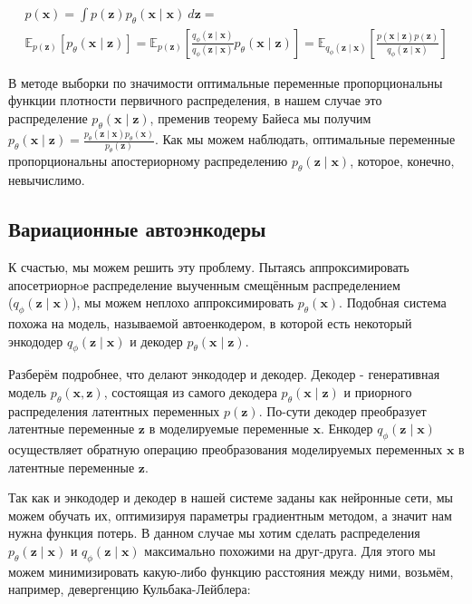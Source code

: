 \documentclass{article}
\begin{document}
\begin{gather*}
    p(\mathbf{x}) = \int p(\mathbf{z})p_\theta(\mathbf{x} \mid \mathbf{x})~d\mathbf{z} =\\
        \mathbb{E}_{p(\mathbf{z})} \left[p_{\theta}(\mathbf{x} \mid \mathbf{z})\right] = 
        \mathbb{E}_{p(\mathbf{z})} \left[\frac{q_\phi(\mathbf{z} \mid \mathbf{x})}{q_\phi(\mathbf{z} \mid \mathbf{x})}p_{\theta}(\mathbf{x} \mid \mathbf{z})\right] =
        \mathbb{E}_{q_\phi(\mathbf{z} \mid \mathbf{x})} \left[\frac{p(\mathbf{x} \mid \mathbf{z})p(\mathbf{z})}{q_\phi(\mathbf{z} \mid \mathbf{x})}\right]
    \tag{3}
\end{gather*}

В методе выборки по значимости оптимальные переменные пропорциональны функции плотности первичного распределения, в нашем случае это распределение
$p_\theta(\mathbf{x} \mid \mathbf{z})$, пременив теорему Байеса мы получим $p_\theta(\mathbf{x} \mid \mathbf{z}) 
= \frac{p_\theta(\mathbf{z} \mid \mathbf{x}) p_\theta(\mathbf{x})}{p_\theta(\mathbf{z})}$. Как мы можем наблюдать, оптимальные переменные пропорциональны
апостериорному распределению $p_\theta(\mathbf{z} \mid \mathbf{x})$, которое, конечно, невычислимо.

\subsection{Вариационные автоэнкодеры}
К счастью, мы можем решить эту проблему. Пытаясь аппроксимировать апосетриорнoе распределение выученным смещённым распределением\\ 
($q_\phi(\mathbf{z} \mid \mathbf{x})$), мы можем неплохо аппроксимировать $p_\theta(\mathbf{x})$. Подобная система похожа на модель, называемой
автоенкодером, в которой есть некоторый энкододер $q_\phi(\mathbf{z} \mid \mathbf{x})$ и декодер $p_\theta(\mathbf{x} \mid \mathbf{z})$.

Разберём подробнее, что делают энкододер и декодер. Декодер - генеративная модель $p_\theta(\mathbf{x}, \mathbf{z})$, состоящая из самого декодера
$p_\theta(\mathbf{x} \mid \mathbf{z})$ и приорного распределения латентных переменных $p(\mathbf{z})$. По-сути декодер преобразует латентные переменные
$\mathbf{z}$ в моделируемые переменные $\mathbf{x}$. Енкодер $q_\phi(\mathbf{z} \mid \mathbf{x})$ осуществляет обратную операцию преобразования моделируемых
переменных $\mathbf{x}$ в латентные переменные $\mathbf{z}$.

Так как и энкододер и декодер в нашей системе заданы как нейронные сети, мы можем обучать их, оптимизируя параметры градиентным методом, а
значит нам нужна функция потерь. В данном случае мы хотим сделать распределения $p_\theta(\mathbf{z} \mid \mathbf{x})$ и $q_\phi(\mathbf{z} \mid \mathbf{x})$
максимально похожими на друг-друга. Для этого мы можем минимизировать какую-либо функцию расстояния между ними, возьмём, например, девергенцию
Кульбака-Лейблера:
\end{document}
